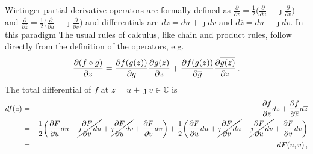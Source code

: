\documentclass{article}
\newcommand{\cplx}{\mathbb{C}}
\newcommand{\iu}{{\jmath}}
\newcommand{\conj}[1]{\overline{#1}}
\begin{document}
Wirtinger partial derivative operators are formally defined as $
  \tfrac{\partial}{\partial z}
    = \tfrac12 \bigl(
      \tfrac{\partial}{\partial u}
      - \iu \tfrac{\partial}{\partial v}
    \bigr)
$ and $
  \tfrac{\partial}{\partial \conj{z}}
    = \tfrac12 \bigl(
      \tfrac{\partial}{\partial u}
      + \iu \tfrac{\partial}{\partial v}
    \bigr)
$ and differentials are $dz = du + \iu dv$ and $d\conj{z} = du - \iu dv$. In this paradigm
The usual rules of calculus, like chain and product rules, follow directly
from the definition of the operators, e.g.
\begin{equation}
    \frac{\partial (f\circ g)}{\partial z}
    = \frac{\partial f(g(z))}{\partial g} \frac{\partial g(z)}{\partial z}
    + \frac{\partial f(g(z))}{\partial \conj{g}} \frac{\partial \conj{g(z)}}{\partial z}
  \,.  \notag
\end{equation}
The total differential of $f$ at $z = u + \iu v \in \cplx$ is
\begin{eqnarray}  
df(z)
  &=& \frac{\partial f}{\partial z} dz
    + \frac{\partial f}{\partial \conj{z}} d\conj{z}
  \notag \\
  &=& \frac12 \biggl(
     \frac{\partial F}{\partial u} du
     - \cancel{\iu \frac{\partial F}{\partial v} du}
     + \cancel{\iu \frac{\partial F}{\partial u} dv}
     + \frac{\partial F}{\partial v} dv
  \biggr)
  + \frac12 \biggl(
     \frac{\partial F}{\partial u} du
     + \cancel{\iu \frac{\partial F}{\partial v} du}
     - \cancel{\iu \frac{\partial F}{\partial u} dv}
     + \frac{\partial F}{\partial v} dv
  \biggr)
  \notag \\
  &=& dF(u, v)
  \,,  \notag
\end{eqnarray}
\end{document}
